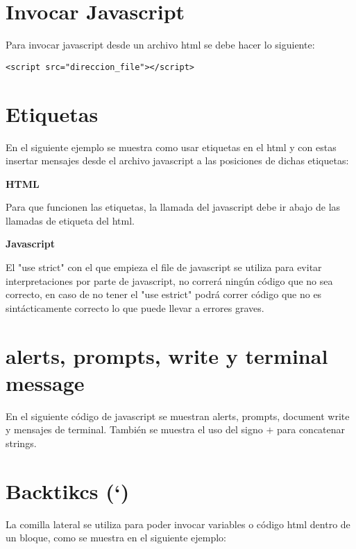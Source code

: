 \section{Invocar Javascript}

Para invocar javascript desde un archivo html se debe hacer lo siguiente:

\begin{lstlisting}[numbers=none]
  <script src="direccion_file"></script>
\end{lstlisting}

\section{Etiquetas}

En el siguiente ejemplo se muestra como usar etiquetas en el html y con estas insertar mensajes desde el archivo javascript a las posiciones de dichas etiquetas:

\textbf{HTML}


Para que funcionen las etiquetas, la llamada del javascript debe ir abajo de las llamadas de etiqueta del html.

\textbf{Javascript}



El "use strict" con el que empieza el file de javascript se utiliza para evitar interpretaciones por parte de javascript, no correr\'a ning\'un c\'odigo que no sea correcto, en caso de no tener el "use estrict" podr\'a correr c\'odigo que no es sint\'acticamente correcto lo que puede llevar a errores graves.

\section{alerts, prompts, write y terminal message}

En el siguiente c\'odigo de javascript se muestran alerts, prompts, document write y mensajes de terminal. Tambi\'en se muestra el uso del signo $+$ para concatenar strings.




\section{Backtikcs (`)}
La comilla lateral se utiliza para poder invocar variables o c\'odigo html dentro de un bloque, como se muestra en el siguiente ejemplo:

